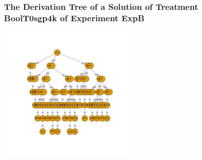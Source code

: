  \begin{frame}
 \frametitle{ The Derivation Tree of a Solution of Treatment BoolT0sgp4k of Experiment ExpB }
 \begin{center}
\includegraphics[width=0.5\textwidth, angle=0]
{ExpBDerivationTreeFigure002.pdf}
 \end{center}
 \label{report/ExpBDerivationTreeFigure002.pdf}  
 \end{frame}

